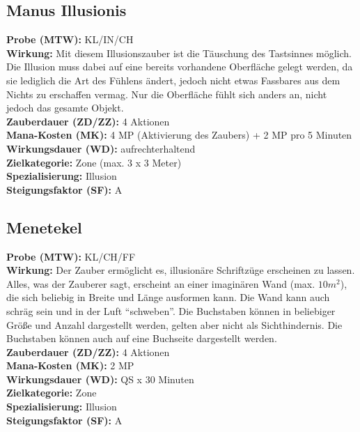 \subsection{Manus Illusionis}
\label{chap:manus_illusionis}
\textbf{Probe (MTW):} KL/IN/CH \\
\textbf{Wirkung:} Mit diesem Illusionszauber ist die Täuschung des Tastsinnes möglich. Die Illusion muss dabei auf eine bereits vorhandene Oberfläche gelegt werden, da sie lediglich die Art des Fühlens ändert, jedoch nicht etwas Fassbares aus dem Nichts zu erschaffen vermag. Nur die Oberfläche fühlt sich anders an, nicht jedoch das gesamte Objekt.\\
\textbf{Zauberdauer (ZD/ZZ):} 4 Aktionen \\
\textbf{Mana-Kosten (MK):} 4 MP (Aktivierung des Zaubers) + 2 MP pro 5 Minuten \\
\textbf{Wirkungsdauer (WD):} aufrechterhaltend \\
\textbf{Zielkategorie:} Zone (max. 3 x 3 Meter) \\
\textbf{Spezialisierung:} Illusion \\
\textbf{Steigungsfaktor (SF):} A


\subsection{Menetekel}
\label{chap:menetekel}
\textbf{Probe (MTW):} KL/CH/FF \\
\textbf{Wirkung:} Der Zauber ermöglicht es, illusionäre Schriftzüge erscheinen zu lassen. Alles, was der Zauberer sagt, erscheint an einer imaginären Wand (max. $10m^2$), die sich beliebig in Breite und Länge ausformen kann. Die Wand kann auch schräg sein und in der Luft "`schweben"'. Die Buchstaben können in beliebiger Größe und Anzahl dargestellt werden, gelten aber nicht als Sichthindernis. Die Buchstaben können auch auf eine Buchseite dargestellt werden.\\
\textbf{Zauberdauer (ZD/ZZ):} 4 Aktionen \\
\textbf{Mana-Kosten (MK):} 2 MP \\
\textbf{Wirkungsdauer (WD):} QS x 30 Minuten \\
\textbf{Zielkategorie:} Zone \\
\textbf{Spezialisierung:} Illusion \\
\textbf{Steigungsfaktor (SF):} A


